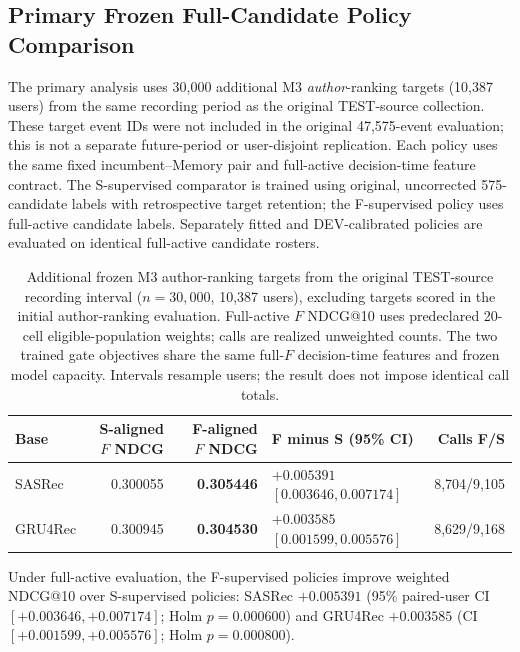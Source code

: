 \documentclass[preprint,12pt]{elsarticle}
\begin{document}
\subsection{Primary Frozen Full-Candidate Policy Comparison}
\label{sec:results-decision}

The primary analysis uses 30,000 additional M3 \emph{author}-ranking targets (10,387 users) from the same recording period as the original TEST-source collection. These target event IDs were not included in the original 47,575-event evaluation; this is not a separate future-period or user-disjoint replication. Each policy uses the same fixed incumbent--Memory pair and full-active decision-time feature contract. The S-supervised comparator is trained using original, uncorrected 575-candidate labels with retrospective target retention; the F-supervised policy uses full-active candidate labels. Separately fitted and DEV-calibrated policies are evaluated on identical full-active candidate rosters.

\begin{table}[!htbp]
\centering
\caption{Additional frozen M3 author-ranking targets from the original TEST-source recording interval ($n=30{,}000$, 10,387 users), excluding targets scored in the initial author-ranking evaluation. Full-active $F$ NDCG@10 uses predeclared 20-cell eligible-population weights; calls are realized unweighted counts. The two trained gate objectives share the same full-$F$ decision-time features and frozen model capacity. Intervals resample users; the result does not impose identical call totals.}
\label{tab:results-m3-b4a-supervision}
\footnotesize
\setlength{\tabcolsep}{4pt}
\begin{tabularx}{\textwidth}{@{}lrrXr@{}}
\toprule
Base & S-aligned $F$ NDCG & F-aligned $F$ NDCG & F minus S (95\% CI) & Calls F/S \\
\midrule
SASRec & 0.300055 & \textbf{0.305446} & $+0.005391$ $[0.003646,0.007174]$ & 8,704/9,105 \\
GRU4Rec & 0.300945 & \textbf{0.304530} & $+0.003585$ $[0.001599,0.005576]$ & 8,629/9,168 \\
\bottomrule
\end{tabularx}
\end{table}

Under full-active evaluation, the F-supervised policies improve weighted NDCG@10 over S-supervised policies: SASRec $+0.005391$ (95\% paired-user CI $[+0.003646,+0.007174]$; Holm $p=0.000600$) and GRU4Rec $+0.003585$ (CI $[+0.001599,+0.005576]$; Holm $p=0.000800$).
\end{document}

